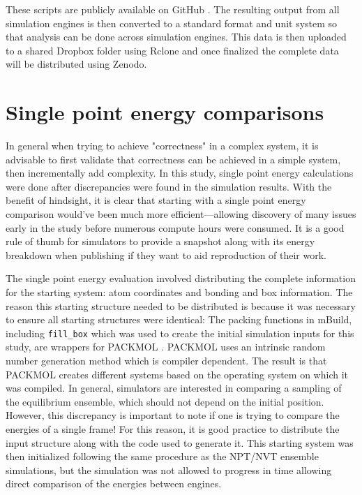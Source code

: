 These scripts are publicly available on GitHub \citep{reproducibility}.
The resulting output from all simulation engines is then converted to a standard format and unit system so that analysis can be done across simulation engines.
This data is then uploaded to a shared Dropbox folder using Rclone and once finalized the complete data will be distributed using Zenodo.

\section{Single point energy comparisons}

In general when trying to achieve "correctness" in a complex system, it is advisable to first validate that correctness can be achieved in a simple system, then incrementally add complexity.
In this study, single point energy calculations were done after discrepancies were found in the simulation results.
With the benefit of hindsight, it is clear that starting with a single point energy comparison would've been much more efficient---allowing discovery of many issues early in the study before numerous compute hours were consumed. 
It is a good rule of thumb for simulators to provide a snapshot along with its energy breakdown when publishing if they want to aid reproduction of their work.

The single point energy evaluation involved distributing the complete information for the starting system: atom coordinates and bonding and box information. 
The reason this starting structure needed to be distributed is because it was necessary to ensure all starting structures were identical:
The packing functions in mBuild, including \lstinline{fill_box} which was used to create the initial simulation inputs for this study, are wrappers for PACKMOL \citep{Martinez2003, Martinez2009}.
PACKMOL uses an intrinsic random number generation method which is compiler dependent. 
The result is that PACKMOL creates different systems based on the operating system on which it was compiled.
In general, simulators are interested in comparing a sampling of the equilibrium ensemble, which should not depend on the initial position.
However, this discrepancy is important to note if one is trying to compare the energies of a single frame!
For this reason, it is good practice to distribute the input structure along with the code used to generate it.
This starting system was then initialized following the same procedure as the NPT/NVT ensemble simulations, but the simulation was not allowed to progress in time allowing direct comparison of the energies between engines.

